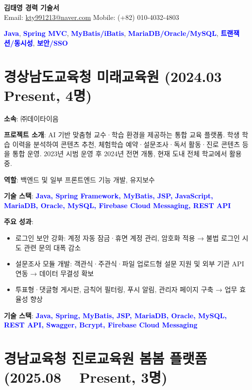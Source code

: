 \documentclass[a4paper,11pt]{article}
\newcommand{\tech}[1]{\textbf{\textcolor{blue}{#1}}}
\begin{document}
\begin{center}
    {\LARGE \textbf{김태영 경력 기술서}} \\[6pt]
    Email: \href{mailto:kty991213@naver.com}{kty991213@naver.com} \quad
    Mobile: (+82) 010-4032-4803
\end{center}

\vspace{0.5cm}

\noindent \tech{Java}, \tech{Spring MVC}, \tech{MyBatis/iBatis}, \tech{MariaDB/Oracle/MySQL}, \tech{트랜잭션/동시성}, \tech{보안/SSO}

\section{경상남도교육청 미래교육원 (2024.03 ~ Present, 4명)}

\textbf{소속}: ㈜데이타이음

\textbf{프로젝트 소개}:  
AI 기반 맞춤형 교수·학습 환경을 제공하는 통합 교육 플랫폼.  
학생 학습 이력을 분석하여 콘텐츠 추천, 체험학습 예약·설문조사·독서 활동·진로 콘텐츠 등을 통합 운영.  
2023년 시범 운영 후 2024년 전면 개통, 현재 도내 전체 학교에서 활용 중.

\textbf{역할}: 백엔드 및 일부 프론트엔드 기능 개발, 유지보수

\textbf{기술 스택}: \tech{Java, Spring Framework, MyBatis, JSP, JavaScript, MariaDB, Oracle, MySQL, Firebase Cloud Messaging, REST API}

\textbf{주요 성과}:
\begin{itemize}[leftmargin=*]
  \item 로그인 보안 강화: 계정 자동 잠금·휴면 계정 관리, 암호화 적용 → 불법 로그인 시도 관련 문의 대폭 감소
  \item 설문조사 모듈 개발: 객관식·주관식·파일 업로드형 설문 지원 및 외부 기관 API 연동 → 데이터 무결성 확보
  \item 투표형·댓글형 게시판, 금칙어 필터링, 푸시 알림, 관리자 페이지 구축 → 업무 효율성 향상
\end{itemize}

\textbf{기술 스택}: \tech{Java, Spring, MyBatis, JSP, MariaDB, Oracle, MySQL, REST API, Swagger, Bcrypt, Firebase Cloud Messaging}

\section{경남교육청 진로교육원 봄봄 플랫폼 (2025.08 ~ Present, 3명)}
\end{document}
